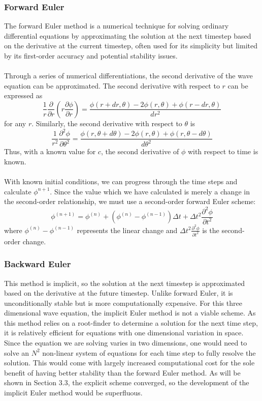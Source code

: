 \documentclass{homework}
\begin{document}
\subsubsection{\textbf{Forward Euler}}
The forward Euler method is a numerical technique for solving ordinary differential equations by approximating the solution at the next timestep based on the derivative at the current timestep, often used for its simplicity but limited by its first-order accuracy and potential stability issues.
\\ \\ \noindent
Through a series of numerical differentiations, the second derivative of the wave equation can be approximated. The second derivative with respect to $r$ can be expressed as
\[ \frac{1}{r} \frac{\partial}{\partial r} \left(r \frac{\partial \phi}{\partial r}\right) = \frac{\phi \left( r+dr,\theta \right) - 2\phi \left( r,\theta \right) + \phi \left( r-dr,\theta \right)}{dr^2}\]
for any $r$. Similarly, the second derivative with respect to $\theta$ is
\[ \frac{1}{r^2} \frac{\partial^2 \phi}{\partial \theta^2} = \frac{\phi \left( r,\theta+d\theta \right) - 2\phi \left( r,\theta \right) + \phi \left( r,\theta-d\theta \right)}{{d\theta}^2}\]
Thus, with a known value for $c$, the second derivative of $\phi$ with respect to time is known.
\\ \\ \noindent
With known initial conditions, we can progress through the time steps and calculate $\phi ^{n+1}$. Since the value which we have calculated is merely a change in the second-order relationship, we must use a second-order forward Euler scheme:
\[
\phi ^ {(n+1)} = \phi^{(n)} + (\phi^{(n)}-\phi^{(n-1)} ) \Delta t +\Delta t^2\frac{\partial^2 \phi}{\partial t^2}
\]
where $\phi^{(n)}-\phi^{(n-1)}$ represents the linear change and $\Delta t^2\frac{\partial^2 \phi}{\partial t^2}$ is the second-order change.

\subsubsection{\textbf{Backward Euler}}
This method is implicit, so the solution at the next timestep is approximated based on the derivative at the future timestep. Unlike forward Euler, it is unconditionally stable but is more computationally expensive. For this three dimensional wave equation, the implicit Euler method is not a viable scheme. As this method relies on a root-finder to determine a solution for the next time step, it is relatively efficient for equations with one dimensional variation in space. Since the equation we are solving varies in two dimensions, one would need to solve an $N^2$ non-linear system of equations for each time step to fully resolve the solution. This would come with largely increased computational cost for the sole benefit of having better stability than the forward Euler method. As will be shown in Section 3.3, the explicit scheme converged, so the development of the implicit Euler method would be superfluous.
\end{document}
